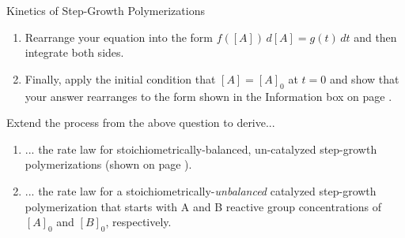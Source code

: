 \begin{activity}{Kinetics of Step-Growth Polymerizations}
\begin{exercises}
\begin{enumerate}
				\item Rearrange your equation into the form $f([A])\,d[A] = g(t)\,dt$ and then integrate both sides.
				
				\item Finally, apply the initial condition that $[A]=[A]_0$ at $t=0$ and show that your answer rearranges to the form shown in the Information box on page \pageref{\labelbase:infobox:catintegrated}.
			\end{enumerate}
			
		\exercise Extend the process from the above question to derive...
			
			\begin{enumerate}
				\item ... the rate law for stoichiometrically-balanced, un-catalyzed step-growth polymerizations (shown on page \pageref{\labelbase:info:uncatintrate}).
				
				\item ... the rate law for a stoichiometrically-\emph{unbalanced} catalyzed step-growth polymerization that starts with A and B reactive group concentrations of $[A]_0$ and $[B]_0$, respectively.
			\end{enumerate}
			
		
\end{exercises}
	
\end{activity}